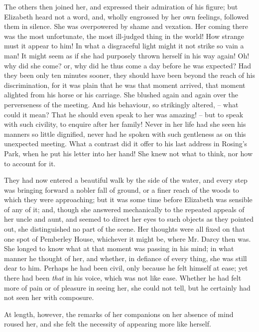 The others then joined her, and expressed their admiration
of his figure; but Elizabeth heard not a word, and,
wholly engrossed by her own feelings, followed them in
silence. She was overpowered by shame and vexation.
Her coming there was the most unfortunate, the most
ill-judged thing in the world! How strange must it
appear to him! In what a disgraceful light might it not
strike so vain a man! It might seem as if she had purposely
thrown herself in his way again! Oh! why did she
come? or, why did he thus come a day before he was
expected? Had they been only ten minutes sooner, they
should have been beyond the reach of his discrimination,
for it was plain that he was that moment arrived, that
moment alighted from his horse or his carriage. She
blushed again and again over the perverseness of the
meeting. And his behaviour, so strikingly altered, -- what
could it mean? That he should even speak to her
was amazing! -- but to speak with such civility, to enquire
after her family! Never in her life had she seen his
manners so little dignified, never had he spoken with such
gentleness as on this unexpected meeting. What a contrast
did it offer to his last address in Rosing’s Park, when he
put his letter into her hand! She knew not what to think,
nor how to account for it.

They had now entered a beautiful walk by the side of
the water, and every step was bringing forward a nobler
fall of ground, or a finer reach of the woods to which they
were approaching; but it was some time before Elizabeth
was sensible of any of it; and, though she answered
mechanically to the repeated appeals of her uncle and
aunt, and seemed to direct her eyes to such objects as
they pointed out, she distinguished no part of the scene.
Her thoughts were all fixed on that one spot of Pemberley
House, whichever it might be, where Mr. Darcy then was.
She longed to know what at that moment was passing
in his mind; in what manner he thought of her, and
whether, in defiance of every thing, she was still dear to
him. Perhaps he had been civil, only because he felt
himself at ease; yet there had been \textit{that} in his voice,
which was not like ease. Whether he had felt more of
pain or of pleasure in seeing her, she could not tell, but he
certainly had not seen her with composure.

At length, however, the remarks of her companions on
her absence of mind roused her, and she felt the necessity
of appearing more like herself.

